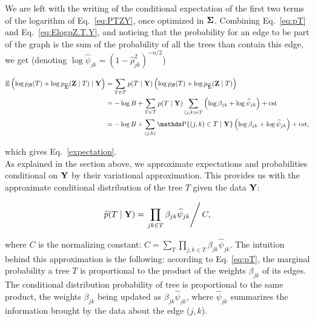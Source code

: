 We are left with the writing of the conditional expectation of the first two terms of the logarithm of Eq.~\eqref{eq:PTZY}, once optimized in ${\boldsymbol{\Sigma}}$. Combining Eq.~\eqref{eq:pT} and Eq.~\eqref{eq:ElogpZ.T.Y}, and noticing that the probability for an edge to be part of the graph is the sum of the probability of all the trees than contain this edge, we get (denoting $\log \widehat{\psi}_{jk} = (1- \widehat{\rho}_{jk}^2)^{-n/2}$)

\begin{align*}
    \Esp\left(\log p_\betab (T) + \log p_{\widehat{\Sigmab}}(\Zb \mid T) \mid \Yb\right)
    & = \sum_{T \in \Tcal} p(T \mid \Yb) \left(\log p_\betab(T) + \log p_{\widehat{\Sigmab}}(\Zb \mid T) \right) \\
    & = -\log B + \sum_{T \in \Tcal} p(T \mid \Yb) \sum_{(j, k) \in T} \left(\log \beta_{jk} +\log \widehat{\psi}_{jk} \right) + \text{cst} \\
    & = -\log B + \sum_{(j, k)} \prob\{(j, k) \in T \mid \Yb\} \left(\log \beta_{jk} + \log \widehat{\psi}_{jk} \right) + \text{cst},
\end{align*}
 
which gives Eq.~\eqref{expectation}.\\
 
As explained in the section above, we approximate expectations and probabilities conditional on ${\bf Y}$ by their variational approximation.
This provides us with the approximate conditional distribution of the tree $T$ given the data ${\bf Y}$:
 
$$
\widetilde{p}(T  \mid  {\bf Y}) = \left. \prod_{jk \in T} \beta_{jk} \widehat{\psi}_{jk}  \right/ C,
$$
 
where $C$ is the normalizing constant: $C = \sum_T \prod_{j, k \in T} \beta_{jk} \widehat{\psi}_{jk}$. The intuition behind this approximation is the following: according to Eq. \eqref{eq:pT}, the marginal probability a tree $T$ is proportional to the product of the weights $\beta_{jk}$ of its edges. The conditional distribution probability of tree is proportional to the same product, the weights $\beta_{jk}$ being updated as $\beta_{jk} \widehat{\psi}_{jk}$, where $\widehat{\psi}_{jk}$ summarizes the information brought by the data about the edge ($j, k$).


